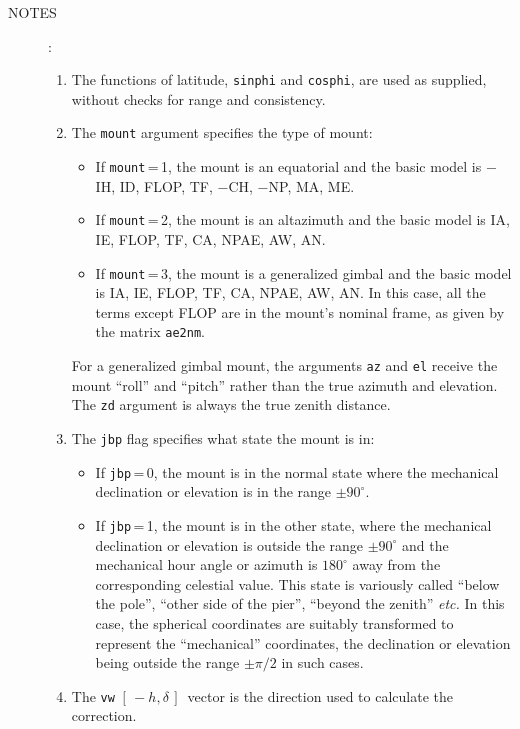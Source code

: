 \documentclass[12pt,fleqn,twoside]{article}
\renewcommand{\_}{{\tt\char'137}}     %
\newcommand{\mhadec}     {$[\,-h,\delta\,]$}
\newcommand{\notes}[1]
{
  \goodbreak
  \begin{description}
    \item[NOTES]: \nopagebreak
        #1
  \end{description}
  \vspace{-3ex}
}
\begin{document}
\notes{
\begin{enumerate}
\setlength{\parskip}{\medskipamount}
\item The functions of latitude, {\tt sinphi} and {\tt cosphi}, are used as
      supplied, without checks for range and consistency.
\item The {\tt mount} argument specifies the type of mount:
      \begin{itemize}
      \item If {\tt mount}\,=\,1, the mount is an equatorial and the
            basic model is $-$IH, ID, FLOP, TF, $-$CH, $-$NP, MA, ME.
      \item If {\tt mount}\,=\,2, the mount is an altazimuth and the
            basic model is IA, IE, FLOP, TF, CA, NPAE, AW, AN.
      \item If {\tt mount}\,=\,3, the mount is a generalized gimbal
            and the basic model is
            IA, IE, FLOP, TF, CA, NPAE, AW, AN.  In this case, all
            the terms except FLOP are in the mount's nominal frame,
            as given by the matrix {\tt ae2nm}.
      \end{itemize}
      For a generalized gimbal mount, the arguments {\tt az} and {\tt el}
      receive the mount ``roll'' and ``pitch'' rather than the true
      azimuth and elevation.  The {\tt zd} argument is always the true
      zenith distance.
\item The {\tt jbp} flag specifies what state the mount is in:
      \begin{itemize}
      \item If {\tt jbp}\,=\,0, the mount is in the normal state
            where the mechanical declination or elevation is in the
            range $\pm90^\circ$.
      \item If {\tt jbp}\,=\,1, the mount is in the other state,
            where the mechanical
            declination or elevation is outside the range $\pm90^\circ$
            and the mechanical hour angle or azimuth is $180^\circ$
            away from the corresponding celestial value.  This state is
            variously called ``below the pole'', ``other side of the pier'',
            ``beyond the zenith'' {\it etc.}  In this case,
            the spherical coordinates are
            suitably transformed to represent the ``mechanical'' coordinates,
            the declination or elevation being outside the range $\pm \pi /2$
            in such cases.
      \end{itemize}
\item The {\tt vw} \mhadec\ vector is the direction used to calculate the
      correction.
\end{enumerate}
}
\end{document}

